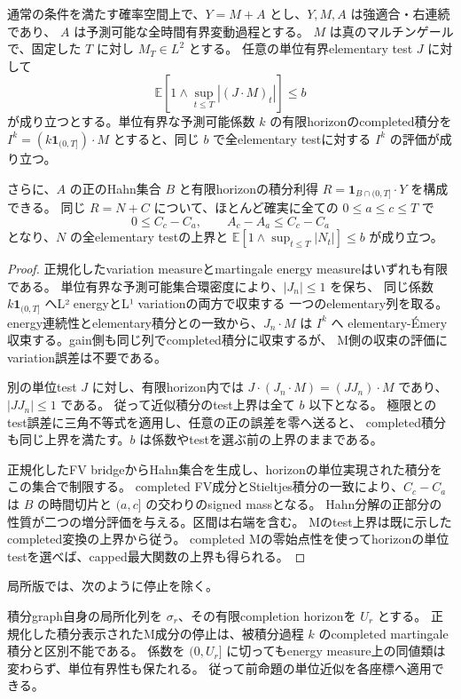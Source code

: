\begin{proposition}[単位有界completed変換と有限horizonのHahn利得]
通常の条件を満たす確率空間上で、$Y=M+A$ とし、$Y,M,A$ は強適合・右連続であり、
$A$ は予測可能な全時間有界変動過程とする。
$M$ は真のマルチンゲールで、固定した $T$ に対し $M_T\in L^2$ とする。
任意の単位有界elementary test $J$ に対して
\[
 \mathbb E\left[1\wedge\sup_{t\leq T}|(J\cdot M)_t|\right]\leq b
\]
が成り立つとする。単位有界な予測可能係数 $k$ の有限horizonのcompleted積分を
$I^k=(k\mathbf 1_{(0,T]})\cdot M$ とすると、同じ $b$ で全elementary testに対する
$I^k$ の評価が成り立つ。

さらに、$A$ の正のHahn集合 $B$ と有限horizonの積分利得
$R=\mathbf 1_{B\cap(0,T]}\cdot Y$ を構成できる。
同じ $R=N+C$ について、ほとんど確実に全ての $0\leq a\leq c\leq T$ で
\[
 0\leq C_c-C_a,\qquad A_c-A_a\leq C_c-C_a
\]
となり、$N$ の全elementary testの上界と
$\mathbb E[1\wedge\sup_{t\leq T}|N_t|]\leq b$ が成り立つ。
\end{proposition}
\begin{proof}
正規化したvariation measureとmartingale energy measureはいずれも有限である。
単位有界な予測可能集合環密度により、$|J_n|\leq1$ を保ち、
同じ係数 $k\mathbf 1_{(0,T]}$ へL² energyとL¹ variationの両方で収束する
一つのelementary列を取る。
energy連続性とelementary積分との一致から、$J_n\cdot M$ は $I^k$ へ
elementary-Émery収束する。gain側も同じ列でcompleted積分に収束するが、
M側の収束の評価にvariation誤差は不要である。

別の単位test $J$ に対し、有限horizon内では
$J\cdot(J_n\cdot M)=(JJ_n)\cdot M$ であり、$|JJ_n|\leq1$ である。
従って近似積分のtest上界は全て $b$ 以下となる。
極限とのtest誤差に三角不等式を適用し、任意の正の誤差を零へ送ると、
completed積分も同じ上界を満たす。$b$ は係数やtestを選ぶ前の上界のままである。

正規化したFV bridgeからHahn集合を生成し、horizonの単位実現された積分をこの集合で制限する。
completed FV成分とStieltjes積分の一致により、$C_c-C_a$ は
$B$ の時間切片と $(a,c]$ の交わりのsigned massとなる。
Hahn分解の正部分の性質が二つの増分評価を与える。区間は右端を含む。
Mのtest上界は既に示したcompleted変換の上界から従う。
completed Mの零始点性を使ってhorizonの単位testを選べば、capped最大関数の上界も得られる。
\end{proof}

局所版では、次のように停止を除く。

積分graph自身の局所化列を $\sigma_r$、その有限completion horizonを $U_r$ とする。
正規化した積分表示されたM成分の停止は、被積分過程 $k$ のcompleted martingale積分と区別不能である。
係数を $(0,U_r]$ に切ってもenergy measure上の同値類は変わらず、単位有界性も保たれる。
従って前命題の単位近似を各座標へ適用できる。

